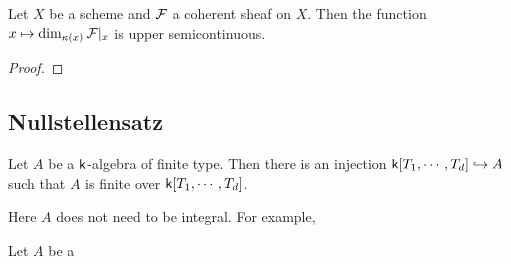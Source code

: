     \begin{corollary}\label{cor: upper semicontinuity of dimension of restriction of coherent sheaf to fiber}
        Let \(X\) be a scheme and \({\mathcal{F}}\) a coherent sheaf on \(X\).
        Then the function \(x \mapsto \dim_{{\kappa}(x)} {\mathcal{F}}|_x\) is upper semicontinuous.
    \end{corollary}
    \begin{proof}
    \end{proof}

\subsection{Nullstellensatz}

    \begin{theorem}\label{thm: Noether's Normalization Lemma}
        Let $A$ be a ${\mathsf{k}}$-algebra of finite type.
        Then there is an injection ${\mathsf{k}}[T_1,\cdots,T_d] \hookrightarrow A$ such that $A$ is finite over ${\mathsf{k}}[T_1,\cdots,T_d]$.
    \end{theorem}

    \begin{remark}
        Here $A$ does not need to be integral. 
        For example, 
    \end{remark}

    \begin{theorem}\label{thm: Nullstellensatz}
        Let $A$ be a 
    \end{theorem}
